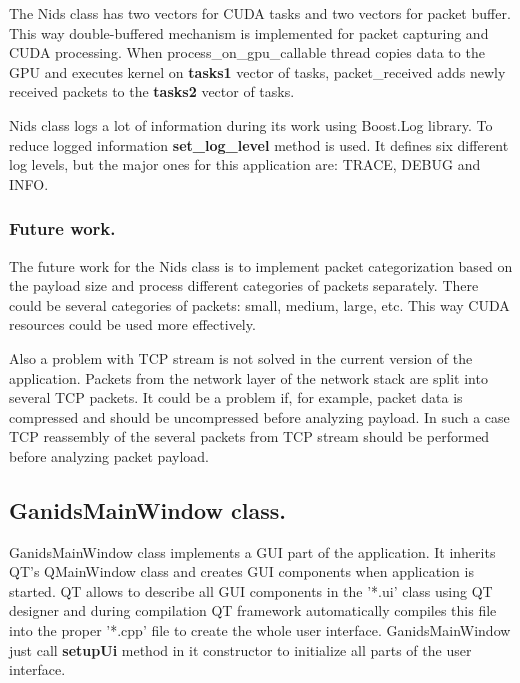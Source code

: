\documentclass[thesis=M,english]{FITthesis}[2011/07/15]
\begin{document}
The Nids class has two vectors for CUDA tasks and two vectors for packet buffer. This way double-buffered mechanism is implemented for packet capturing and CUDA processing. When process\_on\_gpu\_callable thread copies data to the GPU and executes kernel on \textbf{tasks1} vector of tasks, packet\_received adds newly received packets to the \textbf{tasks2} vector of tasks.

Nids class logs a lot of information during its work using Boost.Log library. To reduce logged information \textbf{set\_log\_level} method is used. It defines six different log levels, but the major ones for this application are: TRACE, DEBUG and INFO.

\subsubsection*{Future work.}
The future work for the Nids class is to implement packet categorization based on the payload size and process different categories of packets separately. There could be several categories of packets: small, medium, large, etc. This way CUDA resources could be used more effectively.

Also a problem with TCP stream is not solved in the current version of the application. Packets from the network layer of the network stack are split into several TCP packets. It could be a problem if, for example, packet data is compressed and should be uncompressed before analyzing payload. In such a case TCP reassembly of the several packets from TCP stream should be performed before analyzing packet payload.

\subsection{GanidsMainWindow class.}
GanidsMainWindow class implements a GUI part of the application. It inherits QT's QMainWindow class and creates GUI components when application is started. QT allows to describe all GUI components in the '*.ui' class using QT designer and during compilation QT framework automatically compiles this file into the proper '*.cpp' file to create the whole user interface. GanidsMainWindow just call \textbf{setupUi} method in it constructor to initialize all parts of the user interface.
\end{document}
